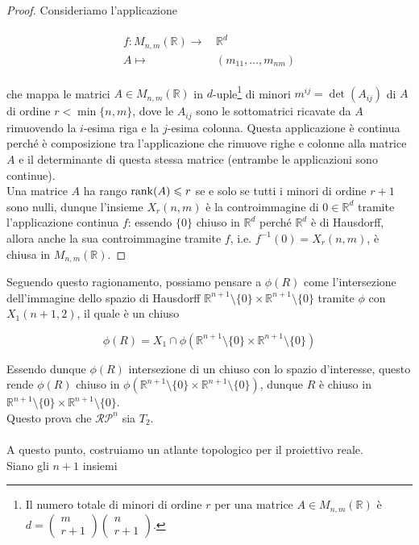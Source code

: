 \begin{proof}
	Consideriamo l'applicazione
	
	\begin{align}
		\begin{split}
			f :  M_{n,m}(\mathbb{R}) \to& \, \mathbb{R}^{d}\\
			A \mapsto& \, (m_{11},\dots,m_{nm})
		\end{split}
	\end{align}

	che mappa le matrici $ A \in M_{n,m}(\mathbb{R}) $ in $ d $-uple\footnote{%
		Il numero totale di minori di ordine $ r $ per una matrice $ A \in M_{n,m}(\mathbb{R}) $ è $ d = \begin{pmatrix} m \\ r+1 \end{pmatrix} \begin{pmatrix} n \\ r+1 \end{pmatrix} $.%
	} di minori $ m^{ij} = \det(A_{ij}) $ di $ A $ di ordine $ r < \min\{n,m\} $, dove le $ A_{ij} $ sono le sottomatrici ricavate da $ A $ rimuovendo la $ i $-esima riga e la $ j $-esima colonna. Questa applicazione è continua perché è composizione tra l'applicazione che rimuove righe e colonne alla matrice $ A $ e il determinante di questa stessa matrice (entrambe le applicazioni sono continue).\\
	Una matrice $ A $ ha rango $ \rank(A) \leqslant r $ se e solo se tutti i minori di ordine $ r+1 $ sono nulli, dunque l'insieme $ X_{r}(n,m) $ è la controimmagine di $ 0 \in \mathbb{R}^{d} $ tramite l'applicazione continua $ f $: essendo $ \{0\} $ chiuso in $ \mathbb{R}^{d} $ perché $ \mathbb{R}^{d} $ è di Hausdorff, allora anche la sua controimmagine tramite $ f $, i.e. $ f^{-1}(0) = X_{r}(n,m) $, è chiusa in $ M_{n,m}(\mathbb{R}) $.
\end{proof}

Seguendo questo ragionamento, possiamo pensare a $ \phi(R) $ come l'intersezione dell'immagine dello spazio di Hausdorff $ \mathbb{R}^{n+1} \setminus \{0\} \times \mathbb{R}^{n+1} \setminus \{0\} $ tramite $ \phi $ con $ X_{1}(n+1,2) $, il quale è un chiuso

\begin{equation}
	\phi(R) = X_{1} \cap \phi(\mathbb{R}^{n+1} \setminus \{0\} \times \mathbb{R}^{n+1} \setminus \{0\})
\end{equation}

Essendo dunque $ \phi(R) $ intersezione di un chiuso con lo spazio d'interesse, questo rende $ \phi(R) $ chiuso in $ \phi(\mathbb{R}^{n+1} \setminus \{0\} \times \mathbb{R}^{n+1} \setminus \{0\}) $, dunque $ R $ è chiuso in $ \mathbb{R}^{n+1} \setminus \{0\} \times \mathbb{R}^{n+1} \setminus \{0\} $.\\
Questo prova che $ \mathcal{RP}^{n} $ sia $ T_{2} $.\\\\
%
A questo punto, costruiamo un atlante topologico per il proiettivo reale.\\
Siano gli $ n+1 $ insiemi

